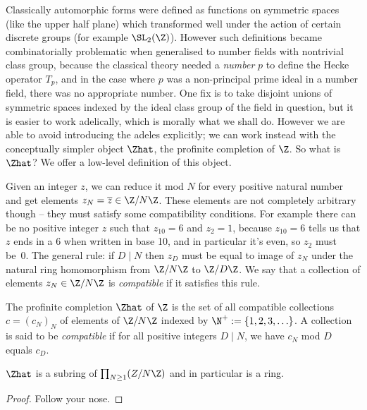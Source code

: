 Classically automorphic forms were defined as functions on symmetric spaces (like the upper half
plane) which transformed well under the action of certain discrete groups (for example $\SL_2(\Z)$).
However such definitions became combinatorially problematic when generalised to number fields
with nontrivial class group, because the classical theory needed a \emph{number} $p$ to define
the Hecke operator $T_p$, and in the case where $p$ was a non-principal prime ideal in a number
field, there was no appropriate number. One fix is to take disjoint unions of symmetric spaces
indexed by the ideal class group of the field in question, but it is easier to work adelically,
which is morally what we shall do. However we are able to avoid introducing the adeles
explicitly; we can work instead with the conceptually simpler object $\Zhat$,
the profinite completion of $\Z$. So what is $\Zhat$? We offer a low-level definition of this object.

Given an integer $z$, we can reduce it mod $N$ for every positive natural
number and get elements $z_N=\overline{z}\in\Z/N\Z$. These elements are not completely arbitrary
though -- they must satisfy some compatibility conditions. For example there can be no
positive integer $z$ such that $z_{10}=6$ and $z_2=1$, because $z_{10}=6$ tells us that
$z$ ends in a 6 when written in base 10, and in particular it's even, so $z_2$ must be~0.
The general rule: if $D\mid N$ then $z_D$ must be equal to image of $z_N$ under the natural
ring homomorphism from $\Z/N\Z$ to $\Z/D\Z$. We say that a collection of elements
$z_N\in\Z/N\Z$ is \emph{compatible} if it satisfies this rule.

\begin{definition}\label{ZHat}\leanok The profinite completion $\Zhat$ of $\Z$ is the set of
    all compatible collections $c=(c_N)_N$ of elements of $\Z/N\Z$ indexed by $\N^+:=\{1,2,3,\ldots\}$.
    A collection is said to be \emph{compatible} if for all positive integers
    $D\mid N$, we have $c_N$ mod $D$ equals $c_D$.
\end{definition}

\begin{lemma}
    \label{ZHat.commRing}
    \leanok
    $\Zhat$ is a subring of $\prod_{N\geq1}(Z/N\Z)$ and in particular is a ring.
\end{lemma}
\begin{proof} \leanok Follow your nose.
\end{proof}

